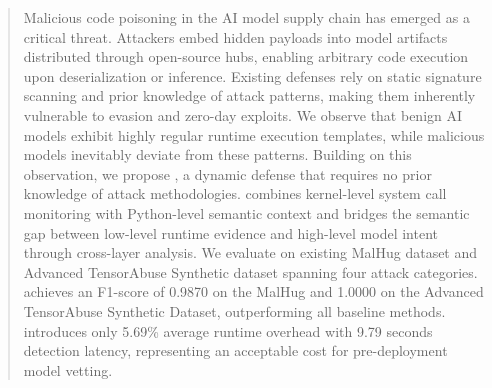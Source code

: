 \begin{abstract}
Malicious code poisoning in the AI model supply chain has emerged as a critical threat. Attackers embed hidden payloads into model artifacts distributed through open-source hubs, enabling arbitrary code execution upon deserialization or inference. Existing defenses rely on static signature scanning and prior knowledge of attack patterns, making them inherently vulnerable to evasion and zero-day exploits.
We observe that benign AI models exhibit highly regular runtime execution templates, while malicious models inevitably deviate from these patterns. Building on this observation, we propose \toolname{}, a dynamic defense that requires no prior knowledge of attack methodologies. \toolname{} combines kernel-level system call monitoring with Python-level semantic context and bridges the semantic gap between low-level runtime evidence and high-level model intent through cross-layer analysis.
We evaluate \toolname{} on existing MalHug dataset and Advanced TensorAbuse Synthetic dataset spanning four attack categories. \toolname{} achieves an F1-score of 0.9870 on the MalHug and 1.0000 on the Advanced TensorAbuse Synthetic Dataset, outperforming all baseline methods. \toolname{} introduces only 5.69\% average runtime overhead with 9.79 seconds detection latency, representing an acceptable cost for pre-deployment model vetting. 
\end{abstract}
